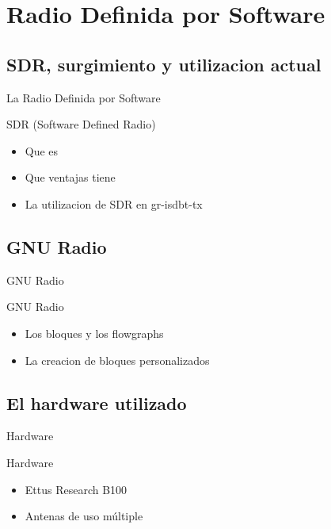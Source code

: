 \section{Radio Definida por Software}

\subsection{SDR, surgimiento y utilizacion actual}

\begin{frame}{La Radio Definida por Software}
\begin{block}{SDR (Software Defined Radio)}
	\begin{itemize}
		\item {	Que es }
		\item { Que ventajas tiene }
		\item { La utilizacion de SDR en gr-isdbt-tx}
	\end{itemize}
\end{block}
\end{frame}

\subsection{GNU Radio}

\begin{frame}{GNU Radio}
\begin{block}{GNU Radio}
	\begin{itemize}
		\item {	Los bloques y los flowgraphs }
		\item { La creacion de bloques personalizados }
	\end{itemize}
\end{block}
\end{frame}

\subsection{El hardware utilizado}

\begin{frame}{Hardware}
\begin{block}{Hardware}
	\begin{itemize}
		\item {	Ettus Research B100 }
		\item { Antenas de uso múltiple }
	\end{itemize}
\end{block}
\end{frame}